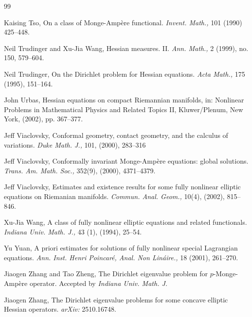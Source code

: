\documentclass{article}
\theoremstyle{plain}
\theoremstyle{definition}
\theoremstyle{definition}
\numberwithin{equation}{section}
\begin{document}
\begin{sloppypar}
\begin{thebibliography}{99}

 

 Kaising Tso, On a class of Monge-Amp\`ere functional. {\em Invent. Math.,} 101 (1990) 425--448.

 Neil Trudinger and  Xu-Jia Wang, Hessian measures. II. {\em Ann. Math.,} 2 (1999), no. 150, 579--604.

 Neil Trudinger,  On the Dirichlet problem for Hessian equations. {\em Acta Math.,} 175 (1995), 151--164.  

 John Urbas, Hessian equations on compact Riemannian manifolds, in: Nonlinear Problems in Mathematical Physics and Related Topics II, Kluwer/Plenum, New York, (2002), pp. 367--377.

 Jeff Viaclovsky,
Conformal geometry, contact geometry, and the calculus of variations. 
{\em Duke Math. J.,}
101, (2000), 283--316 


 Jeff Viaclovsky, Conformally invariant Monge-Amp\`ere equations: global solutions. 
{\em Trans. Am. Math. Soc.,}
352(9), (2000), 4371--4379.
 

 Jeff Viaclovsky,   Estimates and existence results for some fully nonlinear elliptic equations on Riemanian manifolds. 
{\em Commun. Anal. Geom.,}
10(4), (2002), 815--846. 

 Xu-Jia Wang, A class of fully nonlinear elliptic equations and related functionals. {\em  Indiana Univ. Math. J.,} 43 (1), (1994), 25--54.


 Yu Yuan, A priori estimates for solutions of fully nonlinear special Lagrangian equations. {\em Ann. Inst. Henri Poincar\'e, Anal. Non Lin\'aire.,} 18 (2001), 261--270.

 Jiaogen Zhang and Tao Zheng, The Dirichlet eigenvalue problem for $p$-Monge-Amp\`ere operator. Accepted by {\em  Indiana Univ. Math. J.}

 Jiaogen Zhang, The Dirichlet eigenvalue problems for some concave elliptic Hessian operators. {\em arXiv:} 2510.16748.

\end{thebibliography}

\end{sloppypar}	
\end{document}
